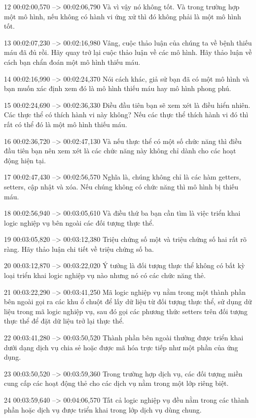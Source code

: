 12
00:02:00,570 --> 00:02:06,790
Và vì vậy nó không tốt.  Và trong trường hợp một mô hình, nếu không có hành vi ứng xử thì đó không phải là một mô hình tốt.

13
00:02:07,230 --> 00:02:16,980
Vâng, cuộc thảo luận của chúng ta về bệnh thiếu máu đã đủ rồi.  Hãy quay trở lại cuộc thảo luận về các mô hình.  Hãy thảo luận về cách bạn chẩn đoán một mô hình thiếu máu.

14
00:02:16,990 --> 00:02:24,370
Nói cách khác, giả sử bạn đã có một mô hình và bạn muốn xác định xem đó là mô hình thiếu máu hay mô hình phong phú.

15
00:02:24,690 --> 00:02:36,330
Điều đầu tiên bạn sẽ xem xét là điều hiển nhiên.  Các thực thể có thích hành vi này không?  Nếu các thực thể thích hành vi đó thì rất có thể đó là một mô hình thiếu máu.

16
00:02:36,720 --> 00:02:47,130
Và nếu thực thể có một số chức năng thì điều đầu tiên bạn nên xem xét là các chức năng này không chỉ dành cho các hoạt động hiện tại.

17
00:02:47,430 --> 00:02:56,570
Nghĩa là, chúng không chỉ là các hàm getters, setters, cập nhật và xóa.  Nếu chúng không có chức năng thì mô hình bị thiếu máu.

18
00:02:56,940 --> 00:03:05,610
Và điều thứ ba bạn cần tìm là việc triển khai logic nghiệp vụ bên ngoài các đối tượng thực thể.

19
00:03:05,820 --> 00:03:12,380
Triệu chứng số một và triệu chứng số hai rất rõ ràng.  Hãy thảo luận chi tiết về triệu chứng số ba.

20
00:03:12,870 --> 00:03:22,020
Ý tưởng là đối tượng thực thể không có bất kỳ loại triển khai logic nghiệp vụ nào nhưng nó có các chức năng thẻ.

21
00:03:22,290 --> 00:03:41,250
Mã logic nghiệp vụ nằm trong một thành phần bên ngoài gọi ra các khu ổ chuột để lấy dữ liệu từ đối tượng thực thể, sử dụng dữ liệu trong mã logic nghiệp vụ, sau đó gọi các phương thức setters trên đối tượng thực thể để đặt dữ liệu trở lại thực thể.

22
00:03:41,280 --> 00:03:50,520
Thành phần bên ngoài thường được triển khai dưới dạng dịch vụ chia sẻ hoặc được mã hóa trực tiếp như một phần của ứng dụng.

23
00:03:50,520 --> 00:03:59,360
Trong trường hợp dịch vụ, các đối tượng miền cung cấp các hoạt động thẻ cho các dịch vụ nằm trong một lớp riêng biệt.

24
00:03:59,640 --> 00:04:06,570
Tất cả logic nghiệp vụ đều nằm trong các thành phần hoặc dịch vụ được triển khai trong lớp dịch vụ dùng chung.

